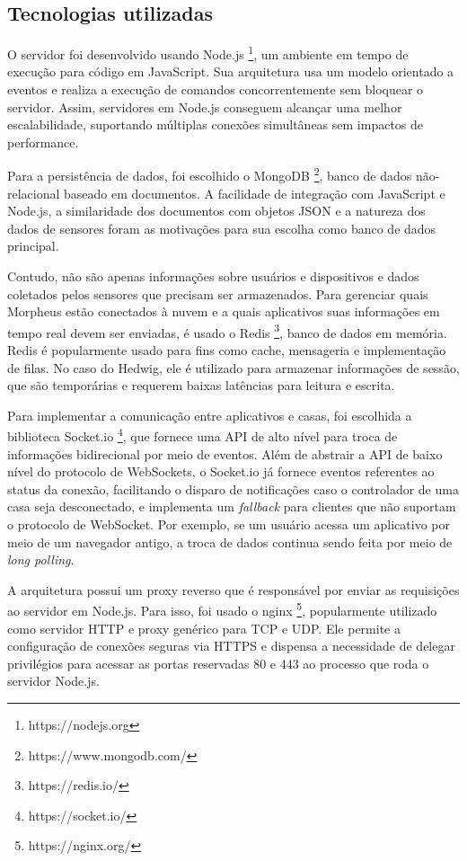 \subsection{Tecnologias utilizadas}

O servidor foi desenvolvido usando Node.js \footnote{https://nodejs.org}, um ambiente em tempo de execução para código em JavaScript. Sua arquitetura usa um modelo orientado a eventos e realiza a execução de comandos concorrentemente sem bloquear o servidor. Assim, servidores em Node.js conseguem alcançar uma melhor escalabilidade, suportando múltiplas conexões simultâneas sem impactos de performance.

Para a persistência de dados, foi escolhido o MongoDB \footnote{https://www.mongodb.com/}, banco de dados não-relacional baseado em documentos. A facilidade de integração com JavaScript e Node.js, a similaridade dos documentos com objetos JSON e a natureza dos dados de sensores foram as motivações para sua escolha como banco de dados principal.

Contudo, não são apenas informações sobre usuários e dispositivos e dados coletados pelos sensores que precisam ser armazenados. Para gerenciar quais Morpheus estão conectados à nuvem e a quais aplicativos suas informações em tempo real devem ser enviadas, é usado o Redis \footnote{https://redis.io/}, banco de dados em memória. Redis é popularmente usado para fins como cache, mensageria e implementação de filas. No caso do Hedwig, ele é utilizado para armazenar informações de sessão, que são temporárias e requerem baixas latências para leitura e escrita.

Para implementar a comunicação entre aplicativos e casas, foi escolhida a biblioteca Socket.io \footnote{https://socket.io/}, que fornece uma API de alto nível para troca de informações bidirecional por meio de eventos. Além de abstrair a API de baixo nível do protocolo de WebSockets, o Socket.io já fornece eventos referentes ao status da conexão, facilitando o disparo de notificações caso o controlador de uma casa seja desconectado, e implementa um \emph{fallback} para clientes que não suportam o protocolo de WebSocket. Por exemplo, se um usuário acessa um aplicativo por meio de um navegador antigo, a troca de dados continua sendo feita por meio de \emph{long polling}.

A arquitetura possui um proxy reverso que é responsável por enviar as requisições ao servidor em Node.js. Para isso, foi usado o nginx \footnote{https://nginx.org/}, popularmente utilizado como servidor HTTP e proxy genérico para TCP e UDP. Ele permite a configuração de conexões seguras via HTTPS e dispensa a necessidade de delegar privilégios para acessar as portas reservadas 80 e 443 ao processo que roda o servidor Node.js.

